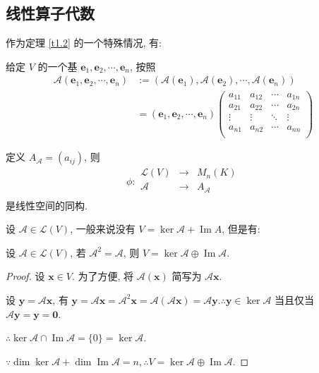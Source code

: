 \documentclass{ctexart}
\begin{document}
\subsection{线性算子代数}
作为定理 \ref{t1.2} 的一个特殊情况, 有:
\begin{theorem}\label{t2.1}
    给定 $V$ 的一个基 $\boldsymbol{e}_1,\boldsymbol{e}_2,\cdots,\boldsymbol{e}_n$, 按照
    \begin{align*}
        \mathcal{A}(\boldsymbol{e}_1,\boldsymbol{e}_2,\cdots,\boldsymbol{e}_n) & :=(\mathcal{A}(\boldsymbol{e}_1),\mathcal{A}(\boldsymbol{e}_2),\cdots,\mathcal{A}(\boldsymbol{e}_n)) \\
        & =(\boldsymbol{e}_1,\boldsymbol{e}_2,\cdots,\boldsymbol{e}_n)\begin{pmatrix}
            a_{11} & a_{12} & \cdots & a_{1n} \\
            a_{21} & a_{22} & \cdots & a_{2n} \\
            \vdots & \vdots & \ddots & \vdots \\
            a_{n1} & a_{n2} & \cdots & a_{nn} \\
        \end{pmatrix}
    \end{align*}

    定义 $A_\mathcal{A}=(a_{ij})$, 则
    \[\phi:\begin{array}{rcl}
        \mathcal{L}(V) & \to & M_n(K) \\
        \mathcal{A} & \to & A_\mathcal{A} \\
    \end{array}\]
    是线性空间的同构.
\end{theorem}
设 $\mathcal{A}\in\mathcal{L}(V)$, 一般来说没有 $V=\ker\mathcal{A}+\operatorname{Im}A$, 但是有:
\begin{example}\label{exa2.1}
    设 $\mathcal{A}\in\mathcal{L}(V)$, 若 $\mathcal{A}^2=\mathcal{A}$, 则 $V=\ker\mathcal{A}\oplus\operatorname{Im}\mathcal{A}$.
\end{example}
\begin{proof}
    设 $\boldsymbol{x}\in V$. 为了方便, 将 $\mathcal{A}(\boldsymbol{x})$ 简写为 $\mathcal{A}\boldsymbol{x}$.

    设 $\boldsymbol{y}=\mathcal{A}\boldsymbol{x}$, 有 $\boldsymbol{y}=\mathcal{A}\boldsymbol{x}=\mathcal{A}^2\boldsymbol{x}=\mathcal{A}(\mathcal{A}\boldsymbol{x})=\mathcal{A}\boldsymbol{y}.\therefore\boldsymbol{y}\in\ker\mathcal{A}$ 当且仅当 $\mathcal{A}\boldsymbol{y}=\boldsymbol{y}=\boldsymbol{0}$.

    $\therefore\ker\mathcal{A}\cap\operatorname{Im}\mathcal{A}=\{0\}=\ker\mathcal{A}$.

    $\because\dim\ker\mathcal{A}+\dim\operatorname{Im}\mathcal{A}=n,\therefore V=\ker\mathcal{A}\oplus\operatorname{Im}\mathcal{A}$.
\end{proof}
\end{document}
